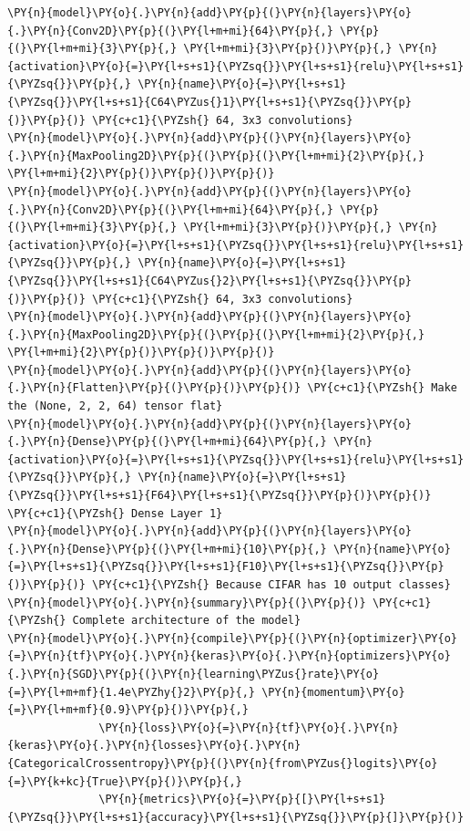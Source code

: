 \documentclass[a4paper,11pt]{article}%
\begin{document}
\begin{tcolorbox}[breakable, size=fbox, boxrule=1pt, pad at break*=1mm,colback=cellbackground, colframe=cellborder]
\begin{Verbatim}[commandchars=\\\{\}]
\PY{n}{model}\PY{o}{.}\PY{n}{add}\PY{p}{(}\PY{n}{layers}\PY{o}{.}\PY{n}{Conv2D}\PY{p}{(}\PY{l+m+mi}{64}\PY{p}{,} \PY{p}{(}\PY{l+m+mi}{3}\PY{p}{,} \PY{l+m+mi}{3}\PY{p}{)}\PY{p}{,} \PY{n}{activation}\PY{o}{=}\PY{l+s+s1}{\PYZsq{}}\PY{l+s+s1}{relu}\PY{l+s+s1}{\PYZsq{}}\PY{p}{,} \PY{n}{name}\PY{o}{=}\PY{l+s+s1}{\PYZsq{}}\PY{l+s+s1}{C64\PYZus{}1}\PY{l+s+s1}{\PYZsq{}}\PY{p}{)}\PY{p}{)} \PY{c+c1}{\PYZsh{} 64, 3x3 convolutions}
\PY{n}{model}\PY{o}{.}\PY{n}{add}\PY{p}{(}\PY{n}{layers}\PY{o}{.}\PY{n}{MaxPooling2D}\PY{p}{(}\PY{p}{(}\PY{l+m+mi}{2}\PY{p}{,} \PY{l+m+mi}{2}\PY{p}{)}\PY{p}{)}\PY{p}{)}
\PY{n}{model}\PY{o}{.}\PY{n}{add}\PY{p}{(}\PY{n}{layers}\PY{o}{.}\PY{n}{Conv2D}\PY{p}{(}\PY{l+m+mi}{64}\PY{p}{,} \PY{p}{(}\PY{l+m+mi}{3}\PY{p}{,} \PY{l+m+mi}{3}\PY{p}{)}\PY{p}{,} \PY{n}{activation}\PY{o}{=}\PY{l+s+s1}{\PYZsq{}}\PY{l+s+s1}{relu}\PY{l+s+s1}{\PYZsq{}}\PY{p}{,} \PY{n}{name}\PY{o}{=}\PY{l+s+s1}{\PYZsq{}}\PY{l+s+s1}{C64\PYZus{}2}\PY{l+s+s1}{\PYZsq{}}\PY{p}{)}\PY{p}{)} \PY{c+c1}{\PYZsh{} 64, 3x3 convolutions}
\PY{n}{model}\PY{o}{.}\PY{n}{add}\PY{p}{(}\PY{n}{layers}\PY{o}{.}\PY{n}{MaxPooling2D}\PY{p}{(}\PY{p}{(}\PY{l+m+mi}{2}\PY{p}{,} \PY{l+m+mi}{2}\PY{p}{)}\PY{p}{)}\PY{p}{)}
\PY{n}{model}\PY{o}{.}\PY{n}{add}\PY{p}{(}\PY{n}{layers}\PY{o}{.}\PY{n}{Flatten}\PY{p}{(}\PY{p}{)}\PY{p}{)} \PY{c+c1}{\PYZsh{} Make the (None, 2, 2, 64) tensor flat}
\PY{n}{model}\PY{o}{.}\PY{n}{add}\PY{p}{(}\PY{n}{layers}\PY{o}{.}\PY{n}{Dense}\PY{p}{(}\PY{l+m+mi}{64}\PY{p}{,} \PY{n}{activation}\PY{o}{=}\PY{l+s+s1}{\PYZsq{}}\PY{l+s+s1}{relu}\PY{l+s+s1}{\PYZsq{}}\PY{p}{,} \PY{n}{name}\PY{o}{=}\PY{l+s+s1}{\PYZsq{}}\PY{l+s+s1}{F64}\PY{l+s+s1}{\PYZsq{}}\PY{p}{)}\PY{p}{)} \PY{c+c1}{\PYZsh{} Dense Layer 1}
\PY{n}{model}\PY{o}{.}\PY{n}{add}\PY{p}{(}\PY{n}{layers}\PY{o}{.}\PY{n}{Dense}\PY{p}{(}\PY{l+m+mi}{10}\PY{p}{,} \PY{n}{name}\PY{o}{=}\PY{l+s+s1}{\PYZsq{}}\PY{l+s+s1}{F10}\PY{l+s+s1}{\PYZsq{}}\PY{p}{)}\PY{p}{)} \PY{c+c1}{\PYZsh{} Because CIFAR has 10 output classes}
\PY{n}{model}\PY{o}{.}\PY{n}{summary}\PY{p}{(}\PY{p}{)} \PY{c+c1}{\PYZsh{} Complete architecture of the model}
\PY{n}{model}\PY{o}{.}\PY{n}{compile}\PY{p}{(}\PY{n}{optimizer}\PY{o}{=}\PY{n}{tf}\PY{o}{.}\PY{n}{keras}\PY{o}{.}\PY{n}{optimizers}\PY{o}{.}\PY{n}{SGD}\PY{p}{(}\PY{n}{learning\PYZus{}rate}\PY{o}{=}\PY{l+m+mf}{1.4e\PYZhy{}2}\PY{p}{,} \PY{n}{momentum}\PY{o}{=}\PY{l+m+mf}{0.9}\PY{p}{)}\PY{p}{,}
              \PY{n}{loss}\PY{o}{=}\PY{n}{tf}\PY{o}{.}\PY{n}{keras}\PY{o}{.}\PY{n}{losses}\PY{o}{.}\PY{n}{CategoricalCrossentropy}\PY{p}{(}\PY{n}{from\PYZus{}logits}\PY{o}{=}\PY{k+kc}{True}\PY{p}{)}\PY{p}{,}
              \PY{n}{metrics}\PY{o}{=}\PY{p}{[}\PY{l+s+s1}{\PYZsq{}}\PY{l+s+s1}{accuracy}\PY{l+s+s1}{\PYZsq{}}\PY{p}{]}\PY{p}{)}

\end{Verbatim}
\end{tcolorbox}
\end{document}
